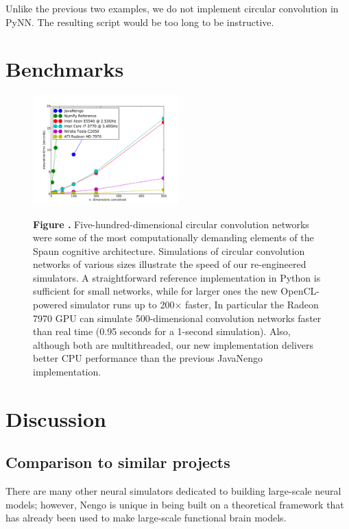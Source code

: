 \documentclass{frontiersSCNS}
\begin{document}
Unlike the previous two examples,
we do not implement
circular convolution in PyNN.
The resulting script would be
too long to be instructive.

\section{Benchmarks}

\begin{figure}
\begin{center}
  \includegraphics[width=0.5\textwidth]{ocl_vs_ref}
\end{center}
 \textbf{
     \label{fig:ocl_vs_ref}
     Figure .}{
     Five-hundred-dimensional circular convolution networks were some of the most
     computationally demanding elements of the Spaun cognitive architecture.
     Simulations of circular convolution networks of various sizes illustrate the speed of our re-engineered simulators.
     A straightforward reference implementation in Python is sufficient for small networks,
     while for larger ones the new OpenCL-powered simulator runs up to 200$\times$ faster,
     In particular the Radeon 7970 GPU can simulate 500-dimensional convolution networks faster than real time (0.95 seconds for a 1-second simulation).
     Also, although both are multithreaded, our new implementation delivers better CPU performance than the previous JavaNengo implementation.
     }
\end{figure}

\section{Discussion}

\subsection{Comparison to similar projects}

There are many other neural simulators
dedicated to building large-scale neural models;
however, Nengo is unique in being built
on a theoretical framework
that has already been used to make
large-scale functional brain models.
\end{document}
